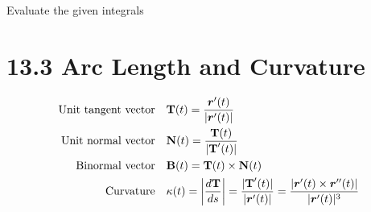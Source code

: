 \documentclass[12pt]{exam}
\newcommand{\bT}{\text{\textbf{T}}}
\newcommand{\bN}{\text{\textbf{N}}}
\newcommand{\bB}{\text{\textbf{B}}}
\begin{document}
\begin{questions}
\ifprintanswers
        \begin{solution}

        \end{solution}
    \else
        \vfill
    \fi


\newpage 

\question Evaluate the given integrals


\newpage

\section*{13.3 Arc Length and Curvature}

\begin{align*}
    \text{Unit tangent vector}\quad & \bT(t) = \dfrac{\br'(t)}{|\br'(t)|} \\
                \text{Unit normal vector}\quad & \bN(t) = \dfrac{\bT(t)}{|\bT'(t)|} \\
                \text{Binormal vector}\quad & \bB(t) = \bT(t)\times \bN(t)\\
                \text{Curvature}\quad & \kappa(t)=\left|\dfrac{d\bT}{ds}\right| = \dfrac{|\bT'(t)|}{|\br'(t)|} = \dfrac{|\br'(t)\times \br''(t)|}{|\br'(t)|^3}
\end{align*}


\end{questions}
\end{document}
